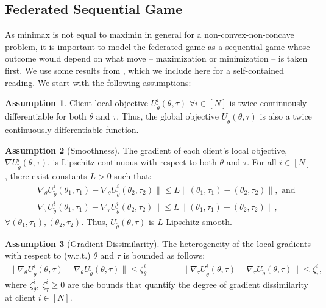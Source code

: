 \documentclass{article}
\let\cite\relax
\newcommand*{\cite}{\citep}
\theoremstyle{definition}
\newtheorem{assumption}{Assumption}%
\begin{document}
\subsection{Federated Sequential Game}
As minimax is not equal to maximin in general for a non-convex-non-concave problem, it is important to model the federated game as a sequential game \cite{pmlr-v119-jin20e} whose outcome would depend on what move -- maximization or minimization -- is taken first. We use some results from \citet{pmlr-v119-jin20e}, which we include here for a self-contained reading. We start with the following assumptions:
\begin{assumption}
\label{asm:twicediff}
    Client-local objective $U_{\tilde\theta}^i(\theta,\tau)$ $\forall i \in [N]$ is twice continuously differentiable for both $\theta$ and $\tau$.
     Thus, the global objective $U_{\tilde\theta}(\theta,\tau)$ is also a twice continuously differentiable function.
\end{assumption}
\begin{assumption}[Smoothness]
\label{asm:lipschitz}
    The gradient of each client's local objective, $ \nabla U_{\tilde\theta}^i(\theta,\tau) $, is Lipschitz continuous with respect to both $\theta$ and $\tau$. For all $ i \in [N] $, there exist constants $L> 0$ such that:
    \begin{align*}
          &\|\nabla_\theta U_{\tilde\theta}^i(\theta_1, \tau_1) - \nabla_\theta U_{\tilde\theta}^i(\theta_2, \tau_2)\|\leq L \|(\theta_1,\tau_1)-(\theta_2,\tau_2)\|,\text{ and}\\
    	&\|\nabla_\tau U_{\tilde\theta}^i(\theta_1, \tau_1) - \nabla_\tau U_{\tilde\theta}^i(\theta_2, \tau_2)\|\leq L \|(\theta_1,\tau_1)-(\theta_2,\tau_2)\|, 
    \end{align*}
    $\forall (\theta_1, \tau_1), (\theta_2, \tau_2)$. Thus, $U_{\tilde\theta}(\theta,\tau) $ is $L$-Lipschitz smooth.
\end{assumption}
\begin{assumption}[Gradient Dissimilarity]
\label{asm:gradientheterogeneity}
The heterogeneity of the local gradients with respect to (w.r.t.) $\theta$ and $\tau$ is bounded as follows:
    \begin{align*}
        \|\nabla_{\theta}U_{\tilde\theta}^i(\theta,\tau)-\nabla_{\theta}U_{\tilde\theta}(\theta,\tau)\|\leq \zeta_{\theta}^i\qquad\qquad
        \|\nabla_{\tau}U_{\tilde\theta}^i(\theta,\tau)-\nabla_{\tau}U_{\tilde\theta}(\theta,\tau)\|\leq \zeta_{\tau}^i,
    \end{align*}
    where $\zeta_{\theta}^i,~\zeta_{\tau}^i\geq0$ are the bounds that quantify the degree of gradient dissimilarity at client $ i \in [N] $.
\end{assumption}
\end{document}
